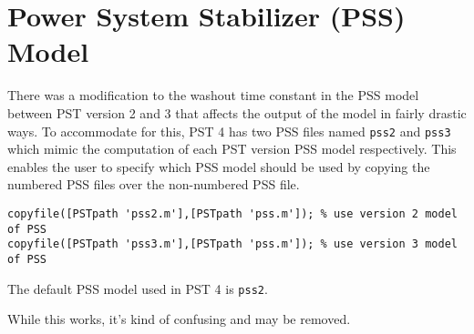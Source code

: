\section{Power System Stabilizer (PSS) Model}  
There was a modification to the washout time constant in the PSS model between PST version 2 and 3 that affects the output of the model in fairly drastic ways.
To accommodate for this, PST 4 has two PSS files named \verb|pss2| and \verb|pss3| which mimic the computation of each PST version PSS model respectively.
This enables the user to specify which PSS model should be used by copying the numbered PSS files over the non-numbered PSS file.
\begin{verbatim}
copyfile([PSTpath 'pss2.m'],[PSTpath 'pss.m']); % use version 2 model of PSS
copyfile([PSTpath 'pss3.m'],[PSTpath 'pss.m']); % use version 3 model of PSS
\end{verbatim}
The default PSS model used in PST 4 is \verb|pss2|.

While this works, it's kind of confusing and may be removed.